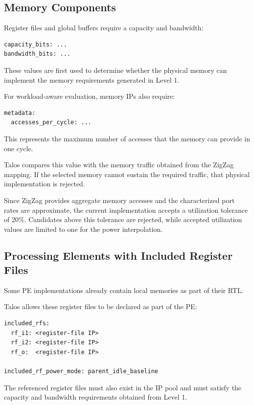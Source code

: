 \subsection{Memory Components}

Register files and global buffers require a capacity and bandwidth:

\begin{verbatim}
capacity_bits: ...
bandwidth_bits: ...
\end{verbatim}

These values are first used to determine whether the physical memory
can implement the memory requirements generated in Level 1.

For workload-aware evaluation, memory IPs also require:

\begin{verbatim}
metadata:
  accesses_per_cycle: ...
\end{verbatim}

This represents the maximum number of accesses that the memory can
provide in one cycle.

Talos compares this value with the memory traffic obtained from the
ZigZag mapping. If the selected memory cannot sustain the required
traffic, that physical implementation is rejected.

Since ZigZag provides aggregate memory accesses and the characterized
port rates are approximate, the current implementation accepts a
utilization tolerance of 20\%. Candidates above this tolerance are
rejected, while accepted utilization values are limited to one for
the power interpolation.


\subsection{Processing Elements with Included Register Files}

Some PE implementations already contain local memories as part of
their RTL.

Talos allows these register files to be declared as part of the PE:

\begin{verbatim}
included_rfs:
  rf_i1: <register-file IP>
  rf_i2: <register-file IP>
  rf_o:  <register-file IP>

included_rf_power_mode: parent_idle_baseline
\end{verbatim}

The referenced register files must also exist in the IP pool and must
satisfy the capacity and bandwidth requirements obtained from Level 1.

